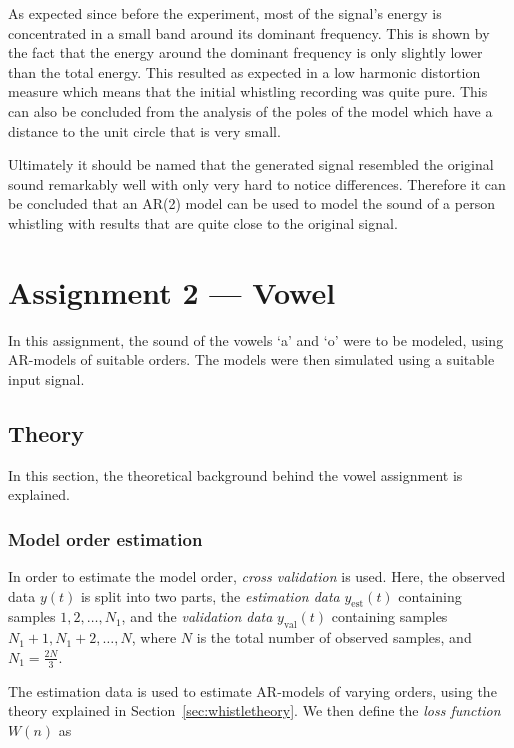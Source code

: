 \documentclass{IEEEtran}
\newcommand{\val}[1]{#1_{\text{val}}}
\newcommand{\est}[1]{#1_{\text{est}}}
\begin{document}
As expected since before the experiment, most of the signal's energy
is concentrated in a small band around its dominant frequency. This
is shown by the fact that the energy around the dominant frequency is
only slightly lower than the total energy. This resulted as expected
in a low harmonic distortion measure which means that the initial
whistling recording was quite pure. This can also be concluded from
the analysis of the poles of the model which have a distance to the
unit circle that is very small.

Ultimately it should be named that the generated signal resembled the
original sound remarkably well with only very hard to notice
differences. Therefore it can be concluded that an AR(2) model can
be used to model the sound of a person whistling with results that
are quite close to the original signal.

\section{Assignment 2 --- Vowel}

In this assignment, the sound of the vowels `a' and `o' were to be
modeled, using AR-models of suitable orders. The models were then
simulated using a suitable input signal.

\subsection{Theory}
\label{sub:voweltheory}

In this section, the theoretical background behind the vowel assignment is
explained.

\subsubsection{Model order estimation}
\label{ssub:modelorderestimation}

In order to estimate the model order, \textit{cross validation} is used.
Here, the observed data $y(t)$ is split into two
parts, the \textit{estimation data} $\est{y}(t)$ containing samples $1,
2,\ldots,N_1$, and
the \textit{validation data} $\val{y}(t)$ containing samples $N_1 + 1, N_1 + 2,
\ldots,N$,
where $N$ is the total number of observed
samples, and $N_1 = \frac{2N}{3}$.

The estimation data is used to estimate AR-models of varying orders, using
the theory explained in Section~\ref{sec:whistletheory}. We then define the
\textit{loss function} $W(n)$ as
\end{document}
